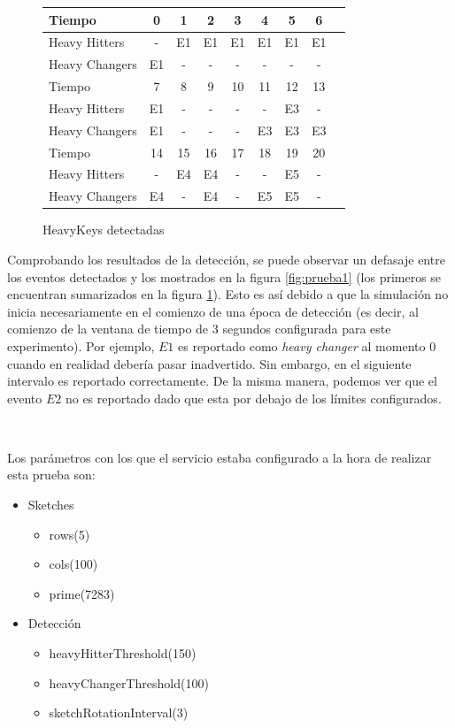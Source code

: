 \documentclass[a4paper,12pt, oneside]{article}
\begin{document}
\begin{figure}[ht]
	\centering
	\begin{tabular}{ | l | c | c | c | c | c | c | c | c |}			
		\hline			
		Tiempo & 0 & 1 & 2 & 3 & 4 & 5 & 6 \\
		\hline
		Heavy Hitters & - & E1 & E1 & E1 & E1 & E1 & E1\\
		Heavy Changers & E1 & - & - & - & - & - & - \\
		\hline
		\hline
		Tiempo & 7 & 8 & 9 & 10 & 11 & 12 & 13  \\
		\hline
		Heavy Hitters & E1 & - & - & - & - & E3 & - \\
		Heavy Changers & E1 & - & - & - & E3 & E3 & E3 \\
		\hline\hline
		Tiempo & 14 & 15 & 16 & 17 & 18 & 19 & 20 \\
		\hline
		Heavy Hitters & - & E4 & E4 & - & - & E5 & - \\
		Heavy Changers & E4 & - & E4 & - & E5 & E5 & - \\
		\hline
	\end{tabular}
	\caption{HeavyKeys detectadas}
	\label{tab:prueba1}
\end{figure}

Comprobando los resultados de la detección, se puede observar un defasaje entre los eventos detectados y los mostrados en la figura \ref{fig:prueba1} (los primeros se encuentran sumarizados en la figura \ref{tab:prueba1}). Esto es así debido a que la simulación no inicia necesariamente en el comienzo de una época de detección (es decir, al comienzo de la ventana de tiempo de $3$ segundos configurada para este experimento). Por ejemplo, $E1$ es reportado como \textit{heavy changer} al momento $0$ cuando en realidad debería pasar inadvertido. Sin embargo, en el siguiente intervalo es reportado correctamente.
De la misma manera, podemos ver que el evento $E2$ no es reportado dado que esta por debajo de los límites configurados.

\

Los parámetros con los que el servicio estaba configurado a la hora de realizar esta prueba son: 

\begin{multicols}{2}
	\begin{itemize}
		\item Sketches
		\begin{itemize}
			\item rows(5)
			\item cols(100)
			\item prime(7283)
		\end{itemize}
	\end{itemize}
	\columnbreak
	\begin{itemize}
		\item Detección
		\begin{itemize}
			\item heavyHitterThreshold(150)
			\item heavyChangerThreshold(100)
			\item sketchRotationInterval(3)
		\end{itemize}
	\end{itemize}
\end{multicols}
\end{document}
